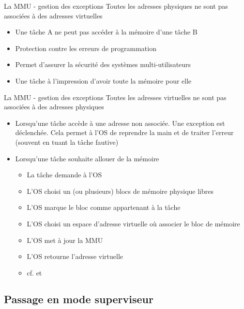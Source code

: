 \begin{frame}{La MMU - gestion des exceptions}
  Toutes les adresses physiques ne sont pas associées à des adresses
  virtuelles
  \begin{itemize}
  \item Une tâche A ne peut pas accéder à la mémoire d'une tâche B
  \item Protection contre les erreurs de programmation
  \item Permet d'assurer la sécurité des systèmes multi-utilisateurs
  \item Une tâche à l'impression d'avoir toute la mémoire pour elle
  \end{itemize}
\end{frame}

\begin{frame}{La MMU - gestion des exceptions}
  Toutes  les  adresses  virtuelles  ne  sont  pas  associées  à  des
  adresses physiques
  \begin{itemize}
  \item  Lorsqu'une tâche  accède à  une adresse  non  associée.  Une
    exception est déclenchée.  Cela permet à l'OS de reprendre la main
    et de traiter l'erreur (souvent en tuant la tâche fautive)
  \item Lorsqu'une tâche souhaite allouer de la mémoire
    \begin{itemize}
    \item  La tâche demande à l'OS
    \item  L'OS choisi  un (ou  plusieurs) blocs  de  mémoire physique
      libres
    \item L'OS marque le bloc comme appartenant à la tâche
    \item  L'OS choisi un  espace d'adresse  virtuelle où  associer le
      bloc de mémoire
    \item L'OS met à jour la MMU
    \item L'OS retourne l'adresse virtuelle
    \item cf.  et 
    \end{itemize}
  \end{itemize}
\end{frame}

\subsection{Passage en mode superviseur}

